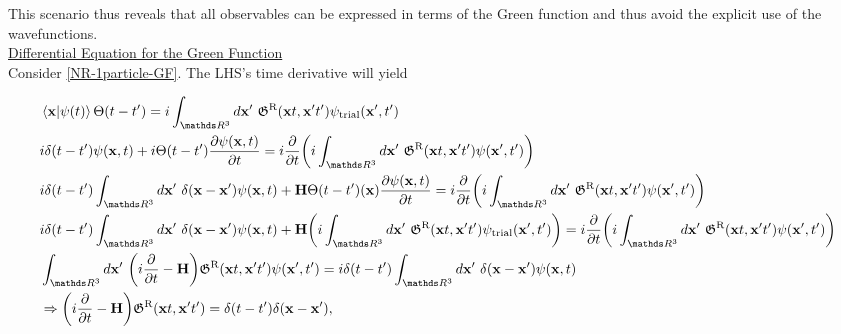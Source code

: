 This scenario thus reveals that all observables can be expressed in terms of the Green function and thus avoid the explicit use of the wavefunctions. \\

\underline{Differential Equation for the Green Function} \\

Consider \cref{NR-1particle-GF}. The LHS's time derivative will yield

\begin{equation}
    \begin{split}
        &\bra{{\bf x}} \ket{\psi(t)} \Theta(t-t') = i \int_{\R^3} d{\bf x}' \blanky \mathfrak{G}^{\textnormal{R}}({\bf x}t, {\bf x}'t') \psi_{\textnormal{trial}}({\bf x}', t') \\
        &i \delta(t-t') \psi({\bf x}, t) + i \Theta(t-t') \frac{\partial \psi({\bf x}, t)}{\partial t} = i \frac{\partial}{\partial t} \bigg(i \int_{\R^3} d{\bf x}' \blanky \mathfrak{G}^{\textnormal{R}}({\bf x}t, {\bf x}'t') \psi({\bf x}', t') \bigg) \\
        & i \delta(t-t') \int_{\R^3} d{\bf x}' \blanky \delta({\bf x}- {\bf x}') \psi({\bf x}, t) + {\bf H} \Theta(t-t') ({\bf x}) \frac{\partial \psi({\bf x}, t)}{\partial t} = i \frac{\partial}{\partial t} \bigg(i \int_{\R^3} d{\bf x}' \blanky \mathfrak{G}^{\textnormal{R}}({\bf x}t, {\bf x}'t') \psi({\bf x}', t') \bigg) \\
        & i \delta(t-t') \int_{\R^3} d{\bf x}' \blanky \delta({\bf x}- {\bf x}') \psi({\bf x}, t) + {\bf H} \bigg(i \int_{\R^3} d{\bf x}' \blanky \mathfrak{G}^{\textnormal{R}}({\bf x}t, {\bf x}'t') \psi_{\textnormal{trial}}({\bf x}', t')\bigg) = i \frac{\partial}{\partial t} \bigg(i \int_{\R^3} d{\bf x}' \blanky \mathfrak{G}^{\textnormal{R}}({\bf x}t, {\bf x}'t') \psi({\bf x}', t') \bigg) \\
        &\int_{\R^3} d{\bf x}' \blanky \bigg(i \frac{\partial}{\partial t} - {\bf H}\bigg) \mathfrak{G}^{\textnormal{R}}({\bf x}t, {\bf x}'t') \psi({\bf x}', t') = i \delta(t-t') \int_{\R^3} d{\bf x}' \blanky \delta({\bf x}- {\bf x}') \psi({\bf x}, t) \\
        & \Rightarrow  \bigg(i \frac{\partial}{\partial t} - {\bf H}\bigg) \mathfrak{G}^{\textnormal{R}}({\bf x}t, {\bf x}'t') = \delta(t-t') \delta({\bf x}- {\bf x}'),
    \end{split}
\end{equation}

